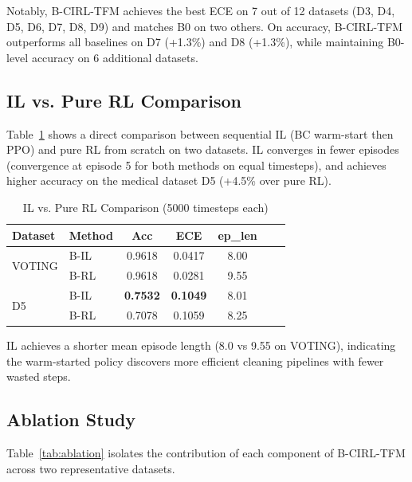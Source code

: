 \documentclass[conference]{IEEEtran}
\begin{document}
Notably, B-CIRL-TFM achieves the best ECE on 7 out of 12 datasets (D3,
D4, D5, D6, D7, D8, D9) and matches B0 on two others. On accuracy,
B-CIRL-TFM outperforms all baselines on D7 (+1.3\%) and D8 (+1.3\%),
while maintaining B0-level accuracy on 6 additional datasets.

\subsection{IL vs. Pure RL Comparison}

Table~\ref{tab:il_vs_rl} shows a direct comparison between sequential IL
(BC warm-start then PPO) and pure RL from scratch on two datasets. IL
converges in fewer episodes (convergence at episode 5 for both methods on
equal timesteps), and achieves higher accuracy on the medical dataset D5
(+4.5\% over pure RL).

\begin{table}[h]
\caption{IL vs. Pure RL Comparison (5000 timesteps each)}
\label{tab:il_vs_rl}
\centering
\begin{tabular}{llccccc}
\toprule
\textbf{Dataset} & \textbf{Method} & \textbf{Acc} & \textbf{ECE} & \textbf{ep\_len} \\
\midrule
\multirow{2}{*}{VOTING} & B-IL & 0.9618 & 0.0417 & 8.00 \\
                         & B-RL & 0.9618 & 0.0281 & 9.55 \\
\midrule
\multirow{2}{*}{D5}      & B-IL & \textbf{0.7532} & \textbf{0.1049} & 8.01 \\
                         & B-RL & 0.7078 & 0.1059 & 8.25 \\
\bottomrule
\end{tabular}
\end{table}

IL achieves a shorter mean episode length (8.0 vs 9.55 on VOTING),
indicating the warm-started policy discovers more efficient cleaning
pipelines with fewer wasted steps.

\subsection{Ablation Study}

Table~\ref{tab:ablation} isolates the contribution of each component of
B-CIRL-TFM across two representative datasets.
\end{document}

